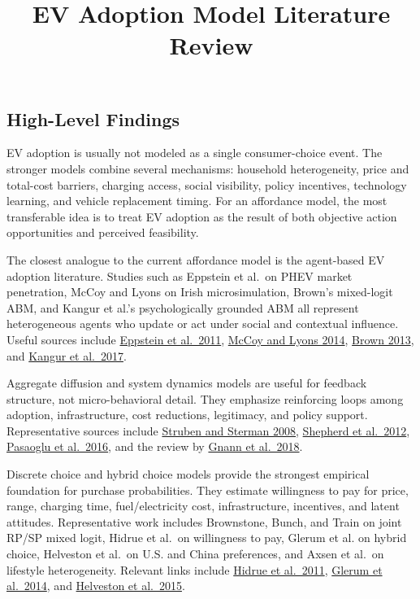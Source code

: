 \documentclass[
]{article}
\title{EV Adoption Model Literature Review}
\author{}
\date{}
\begin{document}
\maketitle

\subsection{High-Level Findings}\label{high-level-findings}

EV adoption is usually not modeled as a single consumer-choice event.
The stronger models combine several mechanisms: household heterogeneity,
price and total-cost barriers, charging access, social visibility,
policy incentives, technology learning, and vehicle replacement timing.
For an affordance model, the most transferable idea is to treat EV
adoption as the result of both objective action opportunities and
perceived feasibility.

The closest analogue to the current affordance model is the agent-based
EV adoption literature. Studies such as Eppstein et al.~on PHEV market
penetration, McCoy and Lyons on Irish microsimulation, Brown's
mixed-logit ABM, and Kangur et al.'s psychologically grounded ABM all
represent heterogeneous agents who update or act under social and
contextual influence. Useful sources include
\href{https://doi.org/10.1016/j.enpol.2011.04.007}{Eppstein et
al.~2011}, \href{https://doi.org/10.1016/j.erss.2014.07.008}{McCoy and
Lyons 2014}, \href{https://doi.org/10.18564/jasss.2127}{Brown 2013}, and
\href{https://doi.org/10.1016/j.jenvp.2017.01.002}{Kangur et al.~2017}.

Aggregate diffusion and system dynamics models are useful for feedback
structure, not micro-behavioral detail. They emphasize reinforcing loops
among adoption, infrastructure, cost reductions, legitimacy, and policy
support. Representative sources include
\href{https://doi.org/10.1068/b33022t}{Struben and Sterman 2008},
\href{https://doi.org/10.1016/j.tranpol.2011.12.006}{Shepherd et
al.~2012},
\href{https://doi.org/10.1016/j.techfore.2015.11.028}{Pasaoglu et
al.~2016}, and the review by
\href{https://doi.org/10.1016/j.rser.2018.03.055}{Gnann et al.~2018}.

Discrete choice and hybrid choice models provide the strongest empirical
foundation for purchase probabilities. They estimate willingness to pay
for price, range, charging time, fuel/electricity cost, infrastructure,
incentives, and latent attitudes. Representative work includes
Brownstone, Bunch, and Train on joint RP/SP mixed logit, Hidrue et
al.~on willingness to pay, Glerum et al. on hybrid choice, Helveston et
al.~on U.S. and China preferences, and Axsen et al.~on lifestyle
heterogeneity. Relevant links include
\href{https://www.sciencedirect.com/science/article/pii/S0928765511000200}{Hidrue
et al.~2011}, \href{https://doi.org/10.1287/trsc.2013.0487}{Glerum et
al.~2014}, and
\href{https://www.cmu.edu/me/ddl/publications/2015-TRA-Helveston-etal-EVs-in-China-US.pdf}{Helveston
et al.~2015}.
\end{document}
